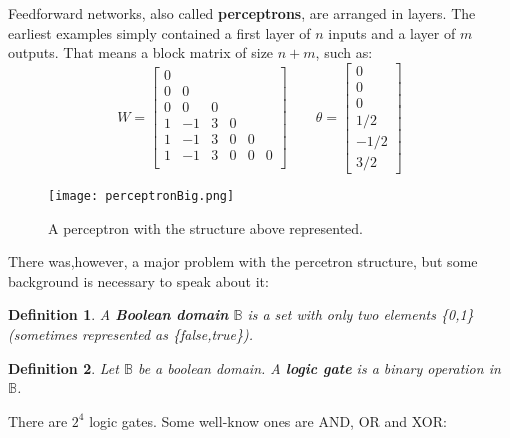 \documentclass[titlepage]{article}
\theoremstyle{plain}
\newtheorem{definition}{Definition}[section]
\theoremstyle{definition}
\begin{document}
		Feedforward networks, also called \textbf{perceptrons}, are arranged in layers. The earliest examples simply contained a first layer of $n$ inputs and a layer of $m$ outputs. That means a block matrix of size $n+m$, such as:
		$$
		W = \begin{bmatrix}
		0 \\
		0 & 0 \\
		0 & 0 & 0 \\
		1 &-1 & 3 & 0 \\
		1 &-1 & 3 & 0 & 0 \\
		1 &-1 & 3 & 0 & 0 & 0 \\
		\end{bmatrix}
		\qquad
		\theta = \begin{bmatrix}
		0 \\ 0 \\ 0 \\ 1/2 \\ -1/2 \\ 3/2 \end{bmatrix}
		$$
		\begin{figure}[H]
			\centering
			\texttt{[image: perceptronBig.png]}
			\caption{A perceptron with the structure above represented.}
			\label{fig:perceptronBig}
		\end{figure}
		There was,however, a major problem with the percetron structure, but some background is necessary to speak about it:
		\begin{definition}
			A \textbf{Boolean domain} $\mathbb{B}$ is a set with only two elements \{0,1\} (sometimes represented as \{false,true\}).
		\end{definition}
		\begin{definition}
			Let $\mathbb{B}$ be a boolean domain. A \textbf{logic gate} is a binary operation in $\mathbb{B}$.
		\end{definition}
		There are $2^4$ logic gates. Some well-know ones are AND, OR and XOR:
\end{document}
